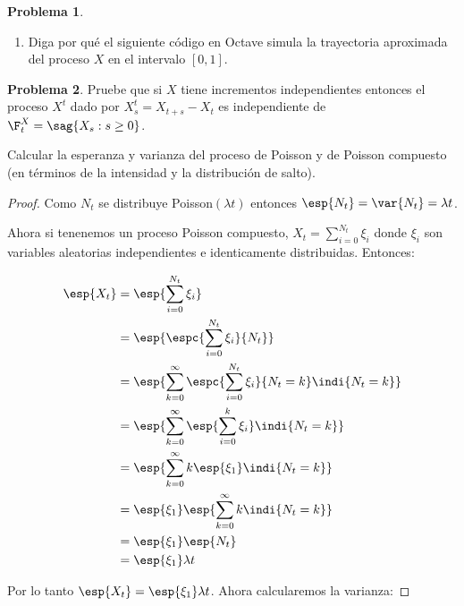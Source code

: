 \documentclass[a5paper,oneside]{amsart}
\theoremstyle{plain}
\theoremstyle{definition}
\newtheorem{problema}{Problema}
\begin{document}
\begin{problema}
\begin{enumerate}
\begin{proof}
Evaluando en $\lambda t^{1/\alpha}$:
\begin{esn}
\phi(\lambda t^{1/\alpha},1)==\exp{}=\exp{}.
\end{esn}

Por lo tanto como $\esp{e^{-\lambda t^{1/\alpha} X_1}}=\esp{e^{-\lambda X_t}}$ entonces $X_t$ se distribuye igual que $t^{1/\alpha}X_1$.
\end{proof}
 \item Diga por qu\'e el siguiente c\'odigo en Octave simula la trayectoria aproximada del proceso $X$ en el intervalo $[0,1]$.
 \end{enumerate}
\end{problema}
\begin{problema}
Pruebe que si $X$ tiene incrementos independientes entonces el proceso $X^t$ dado por $X^t_s=X_{t+s}-X_t$ es independiente de $\F^X_t=\sag{X_s:s\geq 0}$.

Calcular la esperanza y varianza del proceso de Poisson y de Poisson compuesto (en t\'erminos de la intensidad y la distribuci\'on de salto).

\begin{proof}
Como $N_t$ se distribuye Poisson$(\lambda t)$ entonces $\esp{N_t}=\var{N_t}=\lambda t$.

Ahora si tenenemos un proceso Poisson compuesto, $X_t=\sum_{i=0}^{N_t}\xi_i$ donde $\xi_i$ son variables aleatorias independientes e identicamente distribuidas. Entonces:

\begin{align}
\esp{X_t}&=\esp{\sum_{i=0}^{N_t}\xi_i}\notag \\
&=\esp{\espc{\sum_{i=0}^{N_t}\xi_i}{N_t}}\notag \\ &=\esp{\sum_{k=0}^{\infty}\espc{\sum_{i=0}^{N_t}\xi_i}{N_t=k}\indi{N_t=k}}\notag \\
&=\esp{\sum_{k=0}^{\infty}\esp{\sum_{i=0}^{k}\xi_i}\indi{N_t=k}}\notag \\ &=\esp{\sum_{k=0}^{\infty}k\esp{\xi_1}\indi{N_t=k}}\notag \\ &=\esp{\xi_1}\esp{\sum_{k=0}^{\infty}k\indi{N_t=k}} \notag \\
&=\esp{\xi_1}\esp{N_t}\notag \\
&=\esp{\xi_1}\lambda t\notag
\end{align}

Por lo tanto $\esp{X_t}=\esp{\xi_1}\lambda t$.
Ahora calcularemos la varianza:


\end{proof}
\end{problema}
\end{document}
